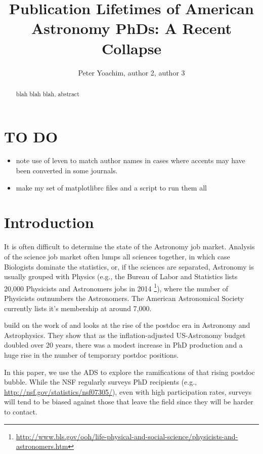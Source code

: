 \documentclass{emulateapj}
\begin{document}
\title{Publication Lifetimes of American Astronomy PhDs: A Recent Collapse}

\author{Peter Yoachim, author 2, author 3 
  }




\begin{abstract}
blah blah blah, abstract

\end{abstract}


\section{TO DO}
\begin{itemize}
\item{note use of leven to match author names in cases where accents may have been converted in some journals. }
  \item{make my set of matplotlibrc files and a script to run them all}
\end{itemize}

\section{Introduction}

It is often difficult to determine the state of the Astronomy job market.  Analysis of the science job market often lumps all sciences together, in which case Biologists dominate the statistics, or, if the sciences are separated, Astronomy is usually grouped with Physics (e.g., the Bureau of Labor and Statistics lists 20,000 Physicists and Astronomers jobs in 2014 \footnote{\url{http://www.bls.gov/ooh/life-physical-and-social-science/physicists-and-astronomers.htm}}), where the number of Physicists outnumbers the Astronomers.  The American Astronomical Society currently lists it's membership at around 7,000.

\citet{Seth09} build on the work of \citet{Metcalfe08} and looks at the rise of the postdoc era in Astronomy and Astrophysics.  They show that as the inflation-adjusted US-Astronomy budget doubled over 20 years, there was a modest increase in PhD production and a huge rise in the number of temporary postdoc positions.

In this paper, we use the ADS to explore the ramifications of that rising postdoc bubble.  While the NSF regularly surveys PhD recipients (e.g., \url{http://nsf.gov/statistics/nsf07305/}), even with high participation rates, surveys will tend to be biased against those that leave the field since they will be harder to contact.
\end{document}
